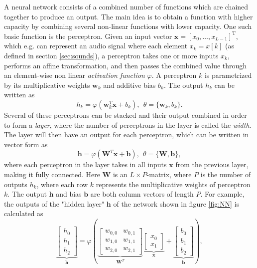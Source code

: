 \documentclass{article}
\begin{document}
A neural network consists of a combined number of functions which are chained together to produce an output. The main idea is to obtain a function with higher capacity by combining several non-linear functions with lower capacity. One such basic function is the perceptron. Given an input vector $\bm{x}=[x_0, \dots, x_{L-1}]^\text{T}$, which e.g. can represent an audio signal where each element $x_k = x[k]$ (as defined in section \ref{sec:sounds}), a perceptron takes one or more inputs $x_k$, performs an affine transformation, and then passes the combined value through an element-wise non linear \textit{activation function} $\varphi$. A perceptron $k$ is parametrized by its multiplicative weights $\bm{w}_k$ and additive bias $b_k$. The output $h_k$ can be written as
\begin{equation} \label{eq:perc}
    h_k = \varphi\left( \bm{w}^T_k \bm{x} + b_k \right), \ \ \theta = \{ \bm{w}_k, b_k\}.
\end{equation}
Several of these perceptrons can be stacked and their output combined in order to form a \textit{layer}, where the number of perceptrons in the layer is called the \textit{width}. The layer will then have an output for each perceptron, which can be written in vector form as
\begin{equation}
    \bm{h} = \varphi\left( \bm{W}^T \bm{x} + \bm{b}\right), \ \ \theta = \{ \bm{W}, \bm{b} \},
\end{equation}
where each perceptron in the layer takes in all inputs $\bm{x}$ from the previous layer, making it fully connected. Here $\bm{W}$ is an $L \times P$-matrix, where $P$ is the number of outputs $h_k$, where each row $k$ represents the multiplicative weights of perceptron $k$. The output $\bm{h}$ and bias $\bm{b}$ are both column vectors of length $P$. For example, the outputs of the "hidden layer" $\bm{h}$ of the network shown in figure \ref{fig:NN} is calculated as
\begin{equation}
\underbrace{
\left[
    \begin{array}{c}
         h_0 \\
         h_1 \\
         h_2
    \end{array} \right]}_{\bm{h}}
= \varphi \left(
\underbrace{\left[ \begin{array}{cc}
     w_{0,0} & w_{0,1} \\
     w_{1,0} & w_{1,1} \\
     w_{2,0} & w_{2,1}
\end{array} \right]}_{\bm{W}^T}
\underbrace{
\left[ 
\begin{array}{c}
     x_0  \\
     x_1 
\end{array}
\right]}_{\bm{x}} +
\underbrace{\left[ 
\begin{array}{c}
    b_0 \\
    b_1 \\
    b_2
\end{array}
\right]}_{\bm{b}}
\right),
\end{equation}
\end{document}
